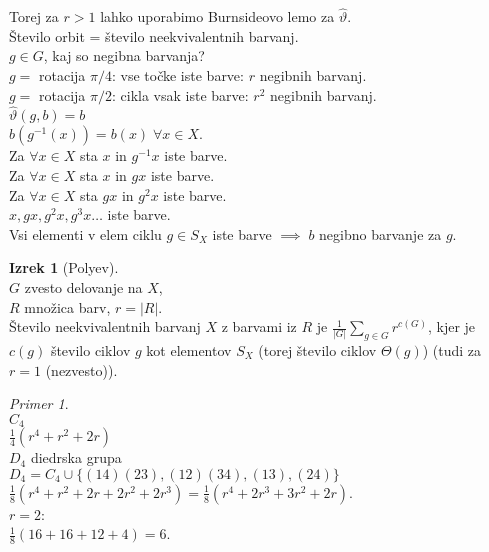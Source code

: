 \documentclass[a4paper, 12pt]{book}
\theoremstyle{definition}
\newtheorem{theorem}[counter]{Izrek}
\theoremstyle{remark}
\newtheorem*{ex}{Primer}
\begin{document}
Torej za $r > 1$ lahko uporabimo Burnsideovo lemo za $\widehat{\vartheta}$. \\
Število orbit = število neekvivalentnih barvanj. \\
$g \in G$, kaj so negibna barvanja? \\
$g =$ rotacija $\pi/4$: vse točke iste barve: $r$ negibnih barvanj. \\
$g =$ rotacija $\pi/2$: cikla vsak iste barve: $r^2$ negibnih barvanj. \\
$\widehat{\vartheta}(g, b) = b$ \\
$b(g^{-1}(x)) = b(x) \; \forall x \in X$. \\
Za $\forall x \in X$ sta $x$ in $g^{-1} x$ iste barve. \\
Za $\forall x \in X$ sta $x$ in $g x$ iste barve. \\
Za $\forall x \in X$ sta $g x$ in $g^{2} x$ iste barve. \\
$x, g x, g^2 x, g^3 x \dots$ iste barve. \\
Vsi elementi v elem ciklu $g \in S_X$ iste barve $\implies \; b$ negibno barvanje za $g$.
\begin{theorem}[Polyev] \text{} \\
  $G$ zvesto delovanje na $X$, \\
  $R$ množica barv, $r = |R|$. \\
  Število neekvivalentnih barvanj $X$ z barvami iz $R$ je $\frac{1}{|G|} \sum_{g \in G} r^{c(G)}$,
  kjer je $c(g)$ število ciklov $g$ kot elementov $S_X$ (torej število ciklov $\Theta(g)$)
  (tudi za $r=1$ (nezvesto)).
\end{theorem}
\begin{ex} \text{} \\
  $C_4$ \\
  $\frac{1}{4} \left(r^4 + r^2 + 2r\right)$ \\
  $D_4$ diedrska grupa \\
  $D_4 = C_4 \cup \{(1 4) (2 3), (1 2) (3 4), (1 3), (2 4)\}$ \\
  $\frac{1}{8} \left(r^4 + r^2 + 2r + 2r^2 + 2r^3\right) = \frac{1}{8} \left(r^4 + 2r^3 + 3r^2 + 2r\right)$. \\
  $r = 2$: \\
  $\frac{1}{8} (16 + 16 + 12 + 4) = 6$.
\end{ex}



%
%



\end{document}
